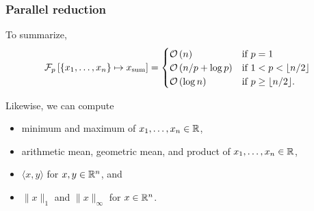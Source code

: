 \documentclass[10pt,mathserif]{beamer}
\begin{document}
\begin{frame}
\frametitle{Parallel reduction}
To summarize,
\begin{align*}
  \mathcal{F}_p\left[\{x_1,\ldots,x_n\}\mapsto x_\mathrm{sum}\right] =
  \begin{cases}
    {\mathcal{O}\left(n\right)} & \mbox{if } p = 1 \\
    {\mathcal{O}\left(n/p + \log p\right)} & \mbox{if } 1< p < \lfloor n/2 \rfloor \\
    {\mathcal{O}\left(\log n\right)} & \text{if } p \ge \lfloor n/2 \rfloor .
  \end{cases}
\end{align*}


\pause
Likewise, we can compute
\begin{itemize}
  \item minimum and maximum of $x_1,\dots,x_n\in\mathbb{R}$,
  \item arithmetic mean, geometric mean, and product of $x_1,\dots,x_n\in\mathbb{R}$,
  \item $\langle x,y\rangle$ for $x,y\in\mathbb{R}^n$, and
  \item $\|x\|_1$ and $\|x\|_\infty$ for $x\in\mathbb{R}^n$.
\end{itemize}
\end{frame}
\end{document}
